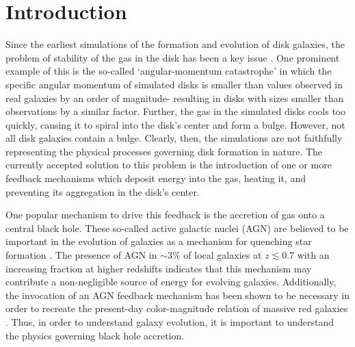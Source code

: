 \section{Introduction}

Since the earliest simulations of the formation and evolution of disk
galaxies, the problem of stability of the gas in the disk has been
a key issue \citep[e.g., ][]{lucy1977anumerical}. One prominent example
of this is the so-called `angular-momentum catastrophe' \citep{navarro1994accretion}
in which the specific angular momentum of simulated disks is smaller
than values observed in real galaxies by an order of magnitude- resulting
in disks with sizes smaller than observations by a similar factor.
Further, the gas in the simulated disks cools too quickly, causing
it to spiral into the disk's center and form a bulge. However, not
all disk galaxies contain a bulge. Clearly, then, the simulations
are not faithfully representing the physical processes governing disk
formation in nature. The currently accepted solution to this problem
is the introduction of one or more feedback mechanisms which deposit
energy into the gas, heating it, and preventing its aggregation in
the disk's center.

One popular mechanism to drive this feedback is the accretion of gas
onto a central black hole. These so-called active galactic nuclei
(AGN) are believed to be important in the evolution of galaxies as
a mechanism for quenching star formation \citep[see ][and references therein]{hopkins2008acosmological}.
The presence of AGN in $\sim3\%$ of local galaxies at $z\lesssim0.7$
\citep{haggard2010thefield} with an increasing fraction at higher
redshifts \citep{martini2013thecluster} indicates that this mechanism
may contribute a non-negligible source of energy for evolving galaxies.
Additionally, the invocation of an AGN feedback mechanism has been
shown to be necessary in order to recreate the present-day color-magnitude
relation of massive red galaxies \citep{springel2005blackholes}.
Thus, in order to understand galaxy evolution, it is important to
understand the physics governing black hole accretion.

